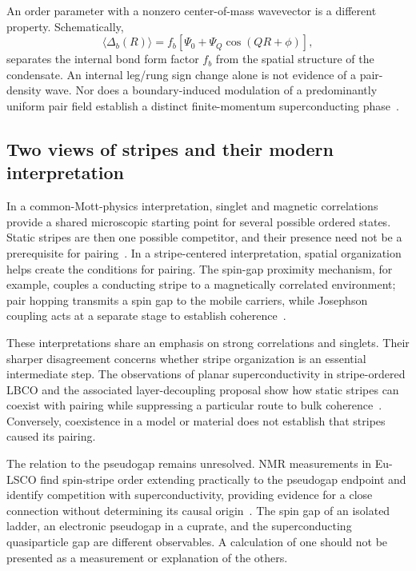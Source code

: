 \documentclass[11pt,letterpaper]{article}
\newcommand{\avg}[1]{\langle #1\rangle}
\begin{document}
An order parameter with a nonzero center-of-mass wavevector is a different
property. Schematically,
\begin{equation}
 \avg{\Delta_b(R)}=f_b\left[\Psi_0+
          \Psi_Q\cos(QR+\phi)\right],
 \label{eq:pdw}
\end{equation}
separates the internal bond form factor $f_b$ from the spatial structure of
the condensate. An internal leg/rung sign change alone is not evidence of a
pair-density wave. Nor does a boundary-induced modulation of a predominantly
uniform pair field establish a distinct finite-momentum superconducting
phase~\citep{Agterberg2020}.

\subsection{Two views of stripes and their modern interpretation}

In a common-Mott-physics interpretation, singlet and magnetic correlations
provide a shared microscopic starting point for several possible ordered
states. Static stripes are then one possible competitor, and their presence
need not be a prerequisite for pairing~\citep{Lee2006}. In a stripe-centered
interpretation, spatial organization helps create the conditions for pairing.
The spin-gap proximity mechanism, for example, couples a conducting stripe
to a magnetically correlated environment; pair hopping transmits a spin gap
to the mobile carriers, while Josephson coupling acts at a separate stage to
establish coherence~\citep{Emery1997}.

These interpretations share an emphasis on strong correlations and singlets.
Their sharper disagreement concerns whether stripe organization is an
essential intermediate step. The observations of planar superconductivity
in stripe-ordered LBCO and the associated layer-decoupling proposal show how
static stripes can coexist with pairing while suppressing a particular route
to bulk coherence~\citep{Li2007,Berg2007}. Conversely, coexistence in a model
or material does not establish that stripes caused its pairing.

The relation to the pseudogap remains unresolved. NMR measurements in Eu-LSCO
find spin-stripe order extending practically to the pseudogap endpoint and
identify competition with superconductivity, providing evidence for a close
connection without determining its causal origin~\citep{Missiaen2025}.
The spin gap of an isolated ladder, an electronic pseudogap in a cuprate, and
the superconducting quasiparticle gap are different observables. A calculation
of one should not be presented as a measurement or explanation of the others.
\end{document}
